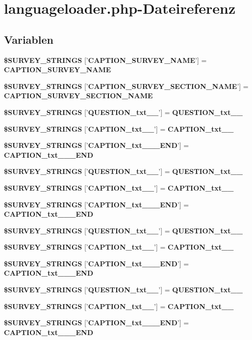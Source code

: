 \section{languageloader.php-Dateireferenz}
\label{iso__9241__10_2languageloader_8php}
\subsection*{Variablen}
\begin{CompactItemize}
\item 
{\bf \$SURVEY\_\-STRINGS} ['{\bf CAPTION\_\-SURVEY\_\-NAME}'] = {\bf CAPTION\_\-SURVEY\_\-NAME}
\item 
{\bf \$SURVEY\_\-STRINGS} ['{\bf CAPTION\_\-SURVEY\_\-SECTION\_\-NAME}'] = {\bf CAPTION\_\-SURVEY\_\-SECTION\_\-NAME}
\item 
{\bf \$SURVEY\_\-STRINGS} ['{\bf QUESTION\_\-txt\_\_\-}'] = {\bf QUESTION\_\-txt\_\_\-}
\item 
{\bf \$SURVEY\_\-STRINGS} ['{\bf CAPTION\_\-txt\_\_\-}'] = {\bf CAPTION\_\-txt\_\_\-}
\item 
{\bf \$SURVEY\_\-STRINGS} ['{\bf CAPTION\_\-txt\_\_\-\_\-END}'] = {\bf CAPTION\_\-txt\_\_\-\_\-END}
\item 
{\bf \$SURVEY\_\-STRINGS} ['{\bf QUESTION\_\-txt\_\_\-}'] = {\bf QUESTION\_\-txt\_\_\-}
\item 
{\bf \$SURVEY\_\-STRINGS} ['{\bf CAPTION\_\-txt\_\_\-}'] = {\bf CAPTION\_\-txt\_\_\-}
\item 
{\bf \$SURVEY\_\-STRINGS} ['{\bf CAPTION\_\-txt\_\_\-\_\-END}'] = {\bf CAPTION\_\-txt\_\_\-\_\-END}
\item 
{\bf \$SURVEY\_\-STRINGS} ['{\bf QUESTION\_\-txt\_\_\-}'] = {\bf QUESTION\_\-txt\_\_\-}
\item 
{\bf \$SURVEY\_\-STRINGS} ['{\bf CAPTION\_\-txt\_\_\-}'] = {\bf CAPTION\_\-txt\_\_\-}
\item 
{\bf \$SURVEY\_\-STRINGS} ['{\bf CAPTION\_\-txt\_\_\-\_\-END}'] = {\bf CAPTION\_\-txt\_\_\-\_\-END}
\item 
{\bf \$SURVEY\_\-STRINGS} ['{\bf QUESTION\_\-txt\_\_\-}'] = {\bf QUESTION\_\-txt\_\_\-}
\item 
{\bf \$SURVEY\_\-STRINGS} ['{\bf CAPTION\_\-txt\_\_\-}'] = {\bf CAPTION\_\-txt\_\_\-}
\item 
{\bf \$SURVEY\_\-STRINGS} ['{\bf CAPTION\_\-txt\_\_\-\_\-END}'] = {\bf CAPTION\_\-txt\_\_\-\_\-END}
\item 

\end{CompactItemize}
